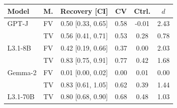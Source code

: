 \begin{tabular}{llcccc}
\toprule \textbf{Model} & \textbf{M.} & \textbf{Recovery [CI]} & \textbf{CV} & \textbf{Ctrl.} & $d$ \\
\midrule
GPT-J & FV & 0.50 [0.33, 0.65] & 0.58 & -0.01 & 2.43 \\
 & TV & 0.56 [0.41, 0.71] & 0.53 & 0.28 & 0.78 \\
L3.1-8B & FV & 0.42 [0.19, 0.66] & 0.37 & 0.00 & 2.03 \\
 & TV & 0.83 [0.75, 0.91] & 0.77 & 0.42 & 1.68 \\
Gemma-2 & FV & 0.01 [0.00, 0.02] & 0.00 & 0.01 & 0.00 \\
 & TV & 0.83 [0.61, 1.05] & 0.62 & 0.39 & 1.44 \\
L3.1-70B & TV & 0.80 [0.68, 0.90] & 0.68 & 0.48 & 1.03 \\
\bottomrule \end{tabular}
